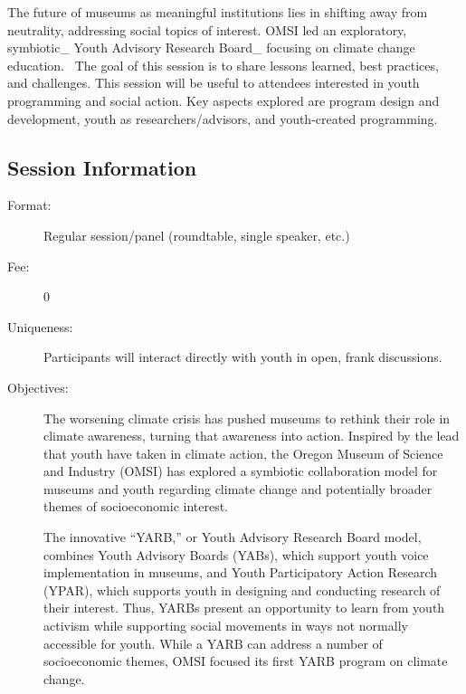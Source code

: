 \documentclass{report}
\begin{document}
              The future of museums as meaningful institutions lies in shifting away from neutrality, addressing social topics of interest. OMSI led an exploratory, symbiotic\_ Youth Advisory Research Board\_ focusing on climate change education. 
The goal of this session is to share lessons learned, best practices, and challenges. This session will be useful to attendees interested in youth programming and social action. Key aspects explored are program design and development, youth as researchers/advisors, and youth-created programming.

              \subsection*{Session Information}
                \begin{description}
                  \item [Format:] Regular session/panel (roundtable, single speaker, etc.)
							    
								  \item [Fee:]0
							     
							    \item [Uniqueness:]Participants will interact directly with youth in open, frank discussions.
							    \item [Objectives:]The worsening climate crisis has pushed museums to rethink their role in climate awareness, turning that awareness into action. Inspired by the lead that youth have taken in climate action, the Oregon Museum of Science and Industry (OMSI) has explored a symbiotic collaboration model for museums and youth regarding climate change and potentially broader themes of socioeconomic interest.

The innovative “YARB,” or Youth Advisory Research Board model, combines Youth Advisory Boards (YABs), which support youth voice implementation in museums, and Youth Participatory Action Research (YPAR), which supports youth in designing and conducting research of their interest. Thus, YARBs present an opportunity to learn from youth activism while supporting social movements in ways not normally accessible for youth. While a YARB can address a number of socioeconomic themes, OMSI focused its first YARB program on climate change.


\end{description}
\end{document}
